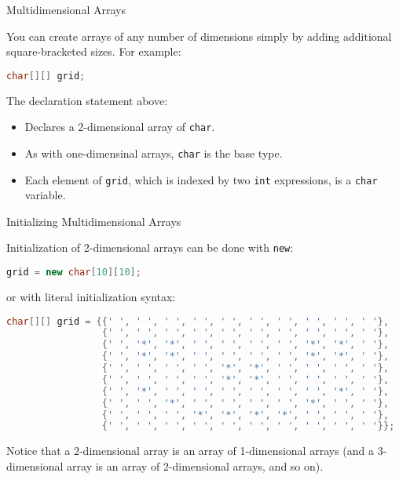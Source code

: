\documentclass{beamer}
\begin{document}
\begin{frame}[fragile]{Multidimensional Arrays}


You can create arrays of any number of dimensions simply by adding additional square-bracketed sizes.  For example:

\begin{lstlisting}[language=Java]
char[][] grid;
\end{lstlisting}
The declaration statement above:
\begin{itemize}
\item Declares a 2-dimensional array of  {\tt char}.
\item As with one-dimensinal arrays, {\tt char} is the base type.
\item Each element of {\tt grid}, which is indexed by two {\tt int} expressions, is a {\tt char} variable.
\end{itemize}


\end{frame}

\begin{frame}[fragile]{Initializing Multidimensional Arrays}


Initialization of 2-dimensional arrays can be done with {\tt new}:
\begin{lstlisting}[language=Java]
grid = new char[10][10];
\end{lstlisting}

or with literal initialization syntax:
\begin{lstlisting}[language=Java]
char[][] grid = {{' ', ' ', ' ', ' ', ' ', ' ', ' ', ' ', ' ', ' '},
                 {' ', ' ', ' ', ' ', ' ', ' ', ' ', ' ', ' ', ' '},
                 {' ', '*', '*', ' ', ' ', ' ', ' ', '*', '*', ' '},
                 {' ', '*', '*', ' ', ' ', ' ', ' ', '*', '*', ' '},
                 {' ', ' ', ' ', ' ', '*', '*', ' ', ' ', ' ', ' '},
                 {' ', ' ', ' ', ' ', '*', '*', ' ', ' ', ' ', ' '},
                 {' ', '*', ' ', ' ', ' ', ' ', ' ', ' ', '*', ' '},
                 {' ', ' ', '*', ' ', ' ', ' ', ' ', '*', ' ', ' '},
                 {' ', ' ', ' ', '*', '*', '*', '*', ' ', ' ', ' '},
                 {' ', ' ', ' ', ' ', ' ', ' ', ' ', ' ', ' ', ' '}};
\end{lstlisting}

Notice that a 2-dimensional array is an array of 1-dimensional arrays (and a 3-dimensional array is an array of 2-dimensional arrays, and so on).

\end{frame}
\end{document}

